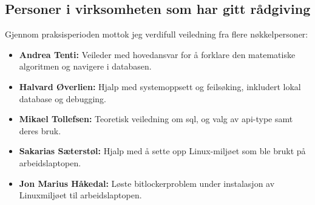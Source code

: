 \subsection{Personer i virksomheten som har gitt rådgiving}

Gjennom praksisperioden mottok jeg verdifull veiledning fra flere nøkkelpersoner:
\begin{itemize}
    \item \textbf{Andrea Tenti:} Veileder med hovedansvar for å forklare den matematiske algoritmen og navigere i databasen.
    \item \textbf{Halvard Øverlien:} Hjalp med systemoppsett og feilsøking, inkludert lokal database og debugging.
    \item \textbf{Mikael Tollefsen:} Teoretisk veiledning om \gls{sql}, og valg av \gls{api}-type samt deres bruk.
    \item \textbf{Sakarias Sæterstøl:} Hjalp med å sette opp Linux-miljøet som ble brukt på arbeidslaptopen.
    \item \textbf{Jon Marius Håkedal:} Løste bitlockerproblem under instalasjon av Linuxmiljøet til arbeidslaptopen.
\end{itemize}